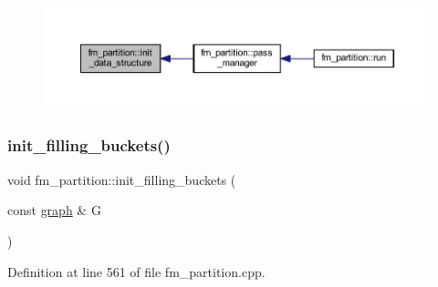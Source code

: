 \begin{figure}[H]
\begin{center}
\leavevmode
\includegraphics[width=350pt]{classfm__partition_a9aa27d4c97616c0fdbd00d11dc83bc0b_icgraph}
\end{center}
\end{figure}
\mbox{\label{classfm__partition_ac510befe1837c646a260a14c110d7a79}} 
\subsubsection{\texorpdfstring{init\+\_\+filling\+\_\+buckets()}{init\_filling\_buckets()}}
{\footnotesize\ttfamily void fm\+\_\+partition\+::init\+\_\+filling\+\_\+buckets (\begin{DoxyParamCaption}\item[{const \mbox{\hyperlink{classgraph}{graph}} \&}]{G }\end{DoxyParamCaption})\hspace{0.3cm}{\ttfamily [protected]}}



Definition at line 561 of file fm\+\_\+partition.\+cpp.


